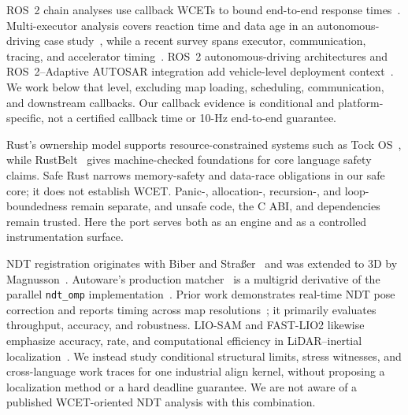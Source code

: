ROS~2 chain analyses use callback WCETs to bound end-to-end response
times~\cite{casini2019ros2}. Multi-executor analysis covers reaction time and data age in an
autonomous-driving case study~\cite{teper2024ros2}, while a recent survey spans executor,
communication, tracing, and accelerator timing~\cite{casini2026ros2survey}. ROS~2
autonomous-driving architectures and ROS~2--Adaptive AUTOSAR integration add vehicle-level
deployment context~\cite{bonci2026ros2av,hong2024autosar}. We work below that level, excluding
map loading, scheduling, communication, and downstream callbacks. Our callback evidence is
conditional and platform-specific, not a certified callback time or 10-Hz end-to-end
guarantee.

Rust's ownership model supports resource-constrained systems such as Tock
OS~\cite{levy2017tock}, while RustBelt~\cite{jung2018rustbelt} gives machine-checked
foundations for core language safety claims. Safe Rust narrows memory-safety and data-race
obligations in our safe core; it does not establish WCET. Panic-, allocation-, recursion-,
and loop-boundedness remain separate, and unsafe code, the C ABI, and dependencies remain
trusted. Here the port serves both as an engine and as a controlled instrumentation surface.

NDT registration originates with Biber and Stra{\ss}er~\cite{biber2003ndt} and was extended
to 3D by Magnusson~\cite{magnusson2009thesis}. Autoware's production matcher~\cite{autoware}
is a multigrid derivative of the parallel \texttt{ndt\_omp} implementation~\cite{ndtomp}.
Prior work demonstrates real-time NDT pose correction and reports timing across map
resolutions~\cite{lim2020realtimendt}; it primarily evaluates throughput, accuracy, and
robustness. LIO-SAM and FAST-LIO2 likewise emphasize accuracy, rate, and computational
efficiency in LiDAR--inertial localization~\cite{shan2020liosam,xu2022fastlio2}. We instead
study conditional structural limits, stress witnesses, and cross-language work traces for one industrial align kernel, without proposing a localization
method or a hard deadline guarantee. We are not aware of a published WCET-oriented NDT
analysis with this combination.
